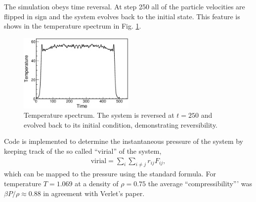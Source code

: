 \documentclass[singlepage,notitlepage,nofootinbib,11pt]{revtex4-1}
\begin{document}
The simulation obeys time reversal. At step 250 all of the particle velocities are flipped in sign and the system evolves back to the initial state. This feature is shows in the temperature spectrum in Fig. \ref{fig11}.
\begin{figure}
  \centering
  \includegraphics[width=0.5\textwidth]{figures/temp.eps}
\hfill
\caption{\label{fig11} Temperature spectrum. The system is reversed at $t=250$ and evolved back to its initial condition, demonstrating reversibility.}
\end{figure}
Code is implemented to determine the instantaneous pressure of the system by keeping track of the so called ``virial'' of the system,
\begin{align*}
\text{virial} = \sum_i\sum_{i\neq j}r_{ij}F_{ij},
\end{align*}
which can be mapped to the pressure using the standard formula. For temperature $T=1.069$ at a density of $\rho=0.75$ the average ``compressibility''' was $\beta P/\rho \approx 0.88$ in agreement with Verlet's paper.
\end{document}
